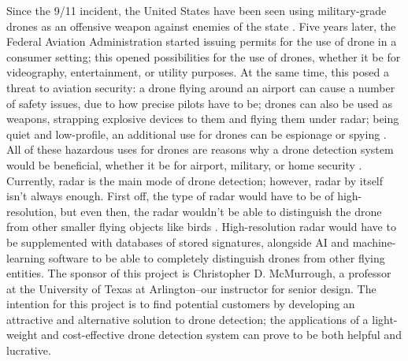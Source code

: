 Since the 9/11 incident, the United States have been seen using military-grade drones as an offensive weapon against enemies of the state \cite{yoo2011assassination}.  Five years later, the Federal Aviation Administration started issuing permits for the use of drone in a consumer setting; this opened possibilities for the use of drones, whether it be for videography, entertainment, or utility purposes.  At the same time, this posed a threat to aviation security:  a drone flying around an airport can cause a number of safety issues, due to how precise pilots have to be; drones can also be used as weapons, strapping explosive devices to them and flying them under radar; being quiet and low-profile, an additional use for drones can be espionage or spying \cite{yaacoub2020security}.  All of these hazardous uses for drones are reasons why a drone detection system would be beneficial, whether it be for airport, military, or home security \cite{kardasz2016drones}.  Currently, radar is the main mode of drone detection; however, radar by itself isn't always enough.  First off, the type of radar would have to be of high-resolution, but even then, the radar wouldn't be able to distinguish the drone from other smaller flying objects like birds \cite{coluccia2020detection}.  High-resolution radar would have to be supplemented with databases of stored signatures, alongside AI and machine-learning software to be able to completely distinguish drones from other flying entities.  The sponsor of this project is Christopher D. McMurrough, a professor at the University of Texas at Arlington--our instructor for senior design.  The intention for this project is to find potential customers by developing an attractive and alternative solution to drone detection; the applications of a light-weight and cost-effective drone detection system can prove to be both helpful and lucrative.